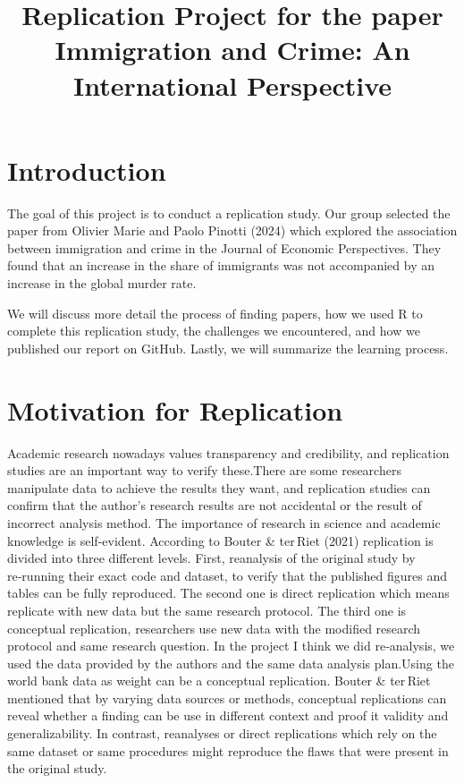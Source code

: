 \documentclass[
  man,
  floatsintext,
  longtable,
  nolmodern,
  notxfonts,
  notimes,
  colorlinks=true,linkcolor=blue,citecolor=blue,urlcolor=blue]{apa7}
\title{Replication Project for the paper Immigration and Crime: An
International Perspective}
\affiliation{
{Hochschule Fresenius}}
\begin{document}
\maketitle




\setlength\LTleft{0pt}




\section{Introduction}\label{introduction}

The goal of this project is to conduct a replication study. Our group
selected the paper from Olivier Marie and Paolo Pinotti (2024) which
explored the association between immigration and crime in the Journal of
Economic Perspectives. They found that an increase in the share of
immigrants was not accompanied by an increase in the global murder rate.

We will discuss more detail the process of finding papers, how we used R
to complete this replication study, the challenges we encountered, and
how we published our report on GitHub. Lastly, we will summarize the
learning process.

\section{Motivation for Replication}\label{motivation-for-replication}

Academic research nowadays values transparency and credibility, and
replication studies are an important way to verify these.There are some
researchers manipulate data to achieve the results they want, and
replication studies can confirm that the author's research results are
not accidental or the result of incorrect analysis method. The
importance of research in science and academic knowledge is
self-evident. According to Bouter \& ter\,Riet (2021) replication is
divided into three different levels. First, reanalysis of the original
study by re‑running their exact code and dataset, to verify that the
published figures and tables can be fully reproduced. The second one is
direct replication which means replicate with new data but the same
research protocol. The third one is conceptual replication, researchers
use new data with the modified research protocol and same research
question. In the project I think we did re‑analysis, we used the data
provided by the authors and the same data analysis plan.Using the world
bank data as weight can be a conceptual replication. Bouter \& ter\,Riet
mentioned that by varying data sources or methods, conceptual
replications can reveal whether a finding can be use in different
context and proof it validity and generalizability. In contrast,
reanalyses or direct replications which rely on the same dataset or same
procedures might reproduce the flaws that were present in the original
study.
\end{document}
